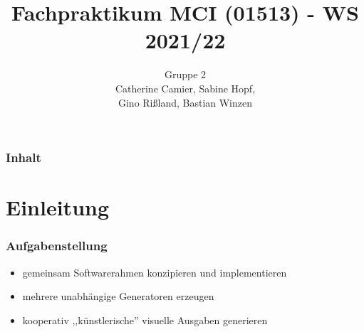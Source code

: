 \documentclass{beamer}
\title{Fachpraktikum MCI (01513) - WS 2021/22}
\author{Gruppe 2\\
	Catherine Camier, Sabine Hopf,\\
	Gino Rißland, Bastian Winzen}
\begin{document}
	
	\begin{frame}
		\titlepage
	\end{frame}
	
	\begin{frame}
		\frametitle{Inhalt}
		\tableofcontents
	\end{frame}
	
	\section{Einleitung}
	
	\begin{frame}
		\frametitle{Aufgabenstellung}
		\begin{itemize}
			\item gemeinsam Softwarerahmen konzipieren und implementieren
			\item mehrere unabhängige Generatoren erzeugen
			\item kooperativ ,,künstlerische'' visuelle Ausgaben generieren
		\end{itemize}
	\end{frame}
\end{document}
